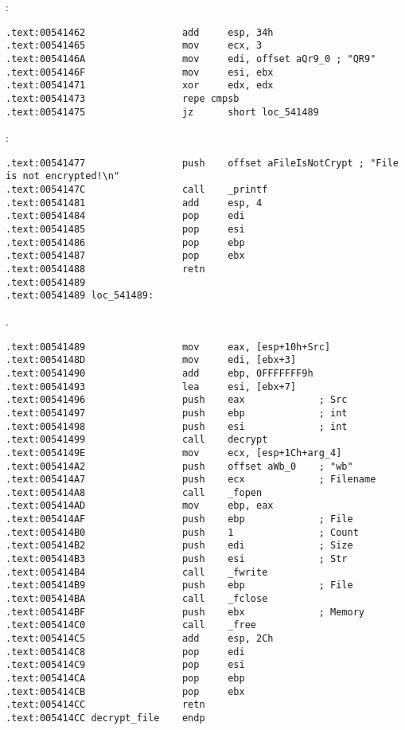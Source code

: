 :

\begin{lstlisting}
.text:00541462                 add     esp, 34h
.text:00541465                 mov     ecx, 3
.text:0054146A                 mov     edi, offset aQr9_0 ; "QR9"
.text:0054146F                 mov     esi, ebx
.text:00541471                 xor     edx, edx
.text:00541473                 repe cmpsb
.text:00541475                 jz      short loc_541489
\end{lstlisting}

:

\begin{lstlisting}
.text:00541477                 push    offset aFileIsNotCrypt ; "File is not encrypted!\n"
.text:0054147C                 call    _printf
.text:00541481                 add     esp, 4
.text:00541484                 pop     edi
.text:00541485                 pop     esi
.text:00541486                 pop     ebp
.text:00541487                 pop     ebx
.text:00541488                 retn
.text:00541489
.text:00541489 loc_541489:
\end{lstlisting}

 .

\begin{lstlisting}
.text:00541489                 mov     eax, [esp+10h+Src]
.text:0054148D                 mov     edi, [ebx+3]
.text:00541490                 add     ebp, 0FFFFFFF9h
.text:00541493                 lea     esi, [ebx+7]
.text:00541496                 push    eax             ; Src
.text:00541497                 push    ebp             ; int
.text:00541498                 push    esi             ; int
.text:00541499                 call    decrypt
.text:0054149E                 mov     ecx, [esp+1Ch+arg_4]
.text:005414A2                 push    offset aWb_0    ; "wb"
.text:005414A7                 push    ecx             ; Filename
.text:005414A8                 call    _fopen
.text:005414AD                 mov     ebp, eax
.text:005414AF                 push    ebp             ; File
.text:005414B0                 push    1               ; Count
.text:005414B2                 push    edi             ; Size
.text:005414B3                 push    esi             ; Str
.text:005414B4                 call    _fwrite
.text:005414B9                 push    ebp             ; File
.text:005414BA                 call    _fclose
.text:005414BF                 push    ebx             ; Memory
.text:005414C0                 call    _free
.text:005414C5                 add     esp, 2Ch
.text:005414C8                 pop     edi
.text:005414C9                 pop     esi
.text:005414CA                 pop     ebp
.text:005414CB                 pop     ebx
.text:005414CC                 retn
.text:005414CC decrypt_file    endp
\end{lstlisting}

